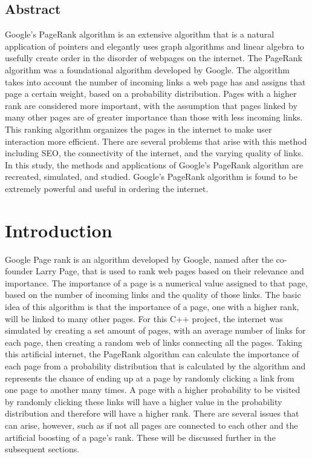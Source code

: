 \documentclass{article}
\title{\Large Google's PageRank \and COE 322 Write-Up}
\author{\and Jackson Thetford (JET3522)
\and Mihiro Suzuki (MS84579) \and Luca Labardini (LL34958)}
\date{December 2022 \and \and}
\begin{document}
\maketitle{} %

\begin{adjustwidth}{80pt}{80pt}


\section{Abstract}
\quad \quad \quad
Google’s PageRank algorithm is an extensive algorithm that is a natural application of pointers and elegantly uses graph algorithms and linear algebra to usefully create order in the disorder of webpages on the internet. The PageRank algorithm was a foundational algorithm developed by Google. The algorithm takes into account the number of incoming links a web page has and assigns that page a certain weight, based on a probability distribution. Pages with a higher rank are considered more important, with the assumption that pages linked by many other pages are of greater importance than those with less incoming links. This ranking algorithm organizes the pages in the internet to make user interaction more efficient. There are several problems that arise with this method including SEO, the connectivity of the internet, and the varying quality of links. In this study, the methods and applications of Google’s PageRank algorithm are recreated, simulated, and studied. Google’s PageRank algorithm is found to be extremely powerful and useful in ordering the internet. 

\end{adjustwidth}
\bigskip \bigskip \bigskip \bigskip

\section{Introduction}
\quad \quad \quad Google Page rank is an algorithm developed by Google, named after the co-founder Larry Page, that is used to rank web pages based on their relevance and importance. The importance of a page is a numerical value assigned to that page, based on the number of incoming links and the quality of those links. The basic idea of this algorithm is that the importance of a page, one with a higher rank, will be linked to many other pages. For this C++ project, the internet was simulated by creating a set amount of pages, with an average number of links for each page, then creating a random web of links connecting all the pages. Taking this artificial internet, the PageRank algorithm can calculate the importance of each page from a probability distribution that is calculated by the algorithm and represents the chance of ending up at a page by randomly clicking a link from one page to another many times. A page with a higher probability to be visited by randomly clicking these links will have a higher value in the probability distribution and therefore will have a higher rank. There are several issues that can arise, however, such as if not all pages are connected to each other and the artificial boosting of a page’s rank. These will be discussed further in the subsequent sections. 
\end{document}

